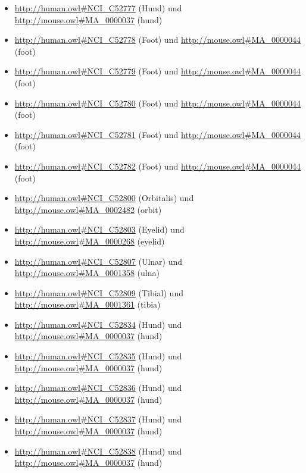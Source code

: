 \begin{itemize}
	\item \url{http://human.owl#NCI_C52777} (Hund\textunderscoreDigit{}\textunderscorePhalanx) und \url{http://mouse.owl#MA_0000037} (hund)
	\item \url{http://human.owl#NCI_C52778} (Foot\textunderscoreDigit{}\textunderscorePhalanx) und \url{http://mouse.owl#MA_0000044} (foot)
	\item \url{http://human.owl#NCI_C52779} (Foot\textunderscoreDigit{}\textunderscorePhalanx) und \url{http://mouse.owl#MA_0000044} (foot)
	\item \url{http://human.owl#NCI_C52780} (Foot\textunderscoreDigit{}\textunderscorePhalanx) und \url{http://mouse.owl#MA_0000044} (foot)
	\item \url{http://human.owl#NCI_C52781} (Foot\textunderscoreDigit{}\textunderscorePhalanx) und \url{http://mouse.owl#MA_0000044} (foot)
	\item \url{http://human.owl#NCI_C52782} (Foot\textunderscoreDigit{}\textunderscorePhalanx) und \url{http://mouse.owl#MA_0000044} (foot)
	\item \url{http://human.owl#NCI_C52800} (Orbitalis\textunderscoreMuscle) und \url{http://mouse.owl#MA_0002482} (orbit)
	\item \url{http://human.owl#NCI_C52803} (Eyelid\textunderscoreMuscle) und \url{http://mouse.owl#MA_0000268} (eyelid)
	\item \url{http://human.owl#NCI_C52807} (Ulnar\textunderscoreNerve) und \url{http://mouse.owl#MA_0001358} (ulna)
	\item \url{http://human.owl#NCI_C52809} (Tibial\textunderscoreNerve) und \url{http://mouse.owl#MA_0001361} (tibia)
	\item \url{http://human.owl#NCI_C52834} (Hund\textunderscoreDigit{}) und \url{http://mouse.owl#MA_0000037} (hund)
	\item \url{http://human.owl#NCI_C52835} (Hund\textunderscoreDigit{}) und \url{http://mouse.owl#MA_0000037} (hund)
	\item \url{http://human.owl#NCI_C52836} (Hund\textunderscoreDigit{}) und \url{http://mouse.owl#MA_0000037} (hund)
	\item \url{http://human.owl#NCI_C52837} (Hund\textunderscoreDigit{}) und \url{http://mouse.owl#MA_0000037} (hund)
	\item \url{http://human.owl#NCI_C52838} (Hund\textunderscoreDigit{}) und \url{http://mouse.owl#MA_0000037} (hund)

\end{itemize}
